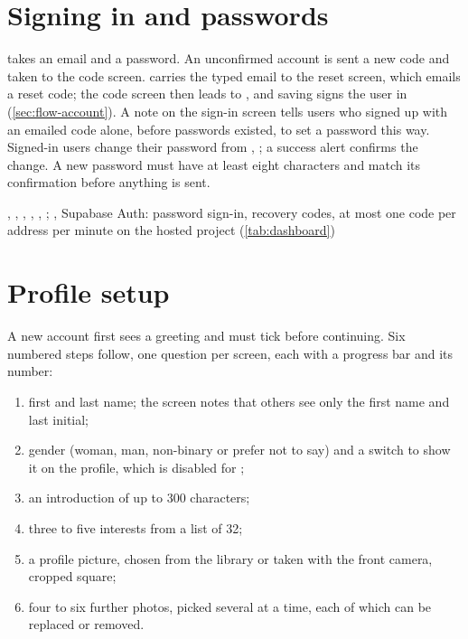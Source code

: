 \section{Signing in and passwords}

 takes an email and a password. An unconfirmed account is sent a new code and taken to the
code screen.  carries the typed email to the reset screen, which emails a reset code;
the code screen then leads to , and saving signs the user in
(\cref{sec:flow-account}). A note on the sign-in screen tells users who signed up with an emailed code
alone, before passwords existed, to set a password this way. Signed-in users change their password from
, ; a success alert confirms the change. A new password must have
at least eight characters and match its confirmation before anything is sent.

\implemented
  {, , , , }
  {, ; , }
  {Supabase Auth: password sign-in, recovery codes, at most one code per address per minute on the hosted project (\cref{tab:dashboard})}

\section{Profile setup}
\label{sec:feature-setup}

A new account first sees a greeting and must tick  before continuing. Six numbered
steps follow, one question per screen, each with a progress bar and its number:

\begin{enumerate}
  \item first and last name; the screen notes that others see only the first name and last initial;
  \item gender (woman, man, non-binary or prefer not to say) and a switch to show it on the profile, which
    is disabled for ;
  \item an introduction of up to 300 characters;
  \item three to five interests from a list of 32;
  \item a profile picture, chosen from the library or taken with the front camera, cropped square;
  \item four to six further photos, picked several at a time, each of which can be replaced or removed.
\end{enumerate}


